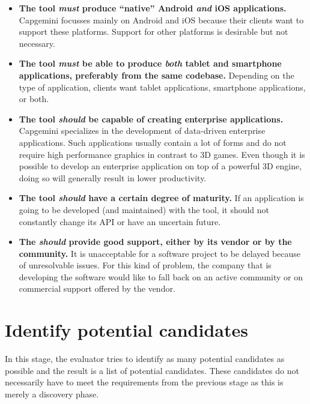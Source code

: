 \begin{itemize}
    \item \textbf{The tool \emph{must} produce ``native'' Android \emph{and} iOS applications.} Capgemini focusses mainly on Android and iOS because their clients want to support these platforms. Support for other platforms is desirable but not necessary.
    \item \textbf{The tool \emph{must} be able to produce \emph{both} tablet and smartphone applications, preferably from the same codebase.} Depending on the type of application, clients want tablet applications, smartphone applications, or both.
    \item \textbf{The tool \emph{should} be capable of creating enterprise applications.} Capgemini specializes in the development of data-driven enterprise applications. Such applications usually contain a lot of forms and do not require high performance graphics in contrast to 3D games. Even though it is possible to develop an enterprise application on top of a powerful 3D engine, doing so will generally result in lower productivity.
    \item \textbf{The tool \emph{should} have a certain degree of maturity.} If an application is going to be developed (and maintained) with the tool, it should not constantly change its API or have an uncertain future. 
    \item \textbf{The \emph{should} provide good support, either by its vendor or by the community.} It is unacceptable for a software project to be delayed because of unresolvable issues. For this kind of problem, the company that is developing the software would like to fall back on an active community or on commercial support offered by the vendor.
\end{itemize}

\section{Identify potential candidates}

In this stage, the evaluator tries to identify as many potential candidates as possible and the result is a list of potential candidates. These candidates do not necessarily have to meet the requirements from the previous stage as this is merely a discovery phase.

